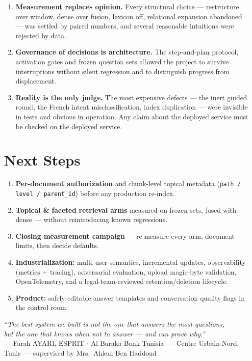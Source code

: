 \documentclass[a4paper,12pt]{report}
\newcommand{\CompanyName}{Al Baraka Bank Tunisia}
\newcommand{\CompanySite}{Centre Urbain Nord, Tunis}
\newcommand{\SupervisorName}{Mrs.\ Ahlem Ben Haddoud}
\begin{document}
\begin{enumerate}[leftmargin=1.2cm, itemsep=4pt]
\item \textbf{Measurement replaces opinion.} Every structural choice --- restructure over window, dense over fusion, lexicon off, relational expansion abandoned --- was settled by paired numbers, and several reasonable intuitions were rejected by data.
\item \textbf{Governance of decisions is architecture.} The step-and-plan protocol, activation gates and frozen question sets allowed the project to survive interruptions without silent regression and to distinguish progress from displacement.
\item \textbf{Reality is the only judge.} The most expensive defects --- the inert guided round, the French intent misclassification, index duplication --- were invisible in tests and obvious in operation. Any claim about the deployed service must be checked on the deployed service.
\end{enumerate}

\section{Next Steps}

\begin{enumerate}[leftmargin=1.2cm, itemsep=2pt]
\item \textbf{Per-document authorization} and chunk-level topical metadata (\texttt{path / level / parent\_id}) before any production re-index.
\item \textbf{Topical \& faceted retrieval arms} measured on frozen sets, fused with dense --- without reintroducing known regressions.
\item \textbf{Closing measurement campaign} --- re-measure every arm, document limits, then decide defaults.
\item \textbf{Industrialization:} multi-user semantics, incremental updates, observability (metrics + tracing), adversarial evaluation, upload magic-byte validation, OpenTelemetry, and a legal-team-reviewed retention/deletion lifecycle.
\item \textbf{Product:} safely editable answer templates and conversation quality flags in the control room.
\end{enumerate}

\vspace{0.6cm}
\begin{center}
\begin{tcolorbox}[colback=softGray, colframe=chapterBlue!20, boxrule=0.5pt, arc=4pt, width=13cm]
\centering\small
\color{textDark!85}\textit{``The best system we built is not the one that answers the most questions,\\ but the one that knows when not to answer --- and can prove why.''}\\[3pt]
\footnotesize\color{espritNavy!70} --- Farah AYARI, ESPRIT $\cdot$ \CompanyName\ --- \CompanySite\ --- supervised by \SupervisorName
\end{tcolorbox}
\end{center}
\end{document}
